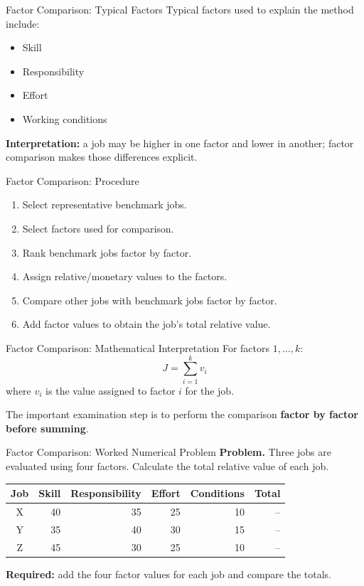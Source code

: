 \documentclass[aspectratio=169,10pt]{beamer}
\begin{document}
\begin{frame}{Factor Comparison: Typical Factors}
Typical factors used to explain the method include:
\begin{itemize}
  \item Skill
  \item Responsibility
  \item Effort
  \item Working conditions
\end{itemize}
\vspace{0.25cm}
\textbf{Interpretation:} a job may be higher in one factor and lower in another; factor comparison makes those differences explicit.
\end{frame}

\begin{frame}{Factor Comparison: Procedure}
\begin{enumerate}
  \item Select representative benchmark jobs.
  \item Select factors used for comparison.
  \item Rank benchmark jobs factor by factor.
  \item Assign relative/monetary values to the factors.
  \item Compare other jobs with benchmark jobs factor by factor.
  \item Add factor values to obtain the job's total relative value.
\end{enumerate}
\end{frame}

\begin{frame}{Factor Comparison: Mathematical Interpretation}
For factors $1,\ldots,k$:
\[
\boxed{J=\sum_{i=1}^{k}v_i}
\]
where $v_i$ is the value assigned to factor $i$ for the job.

\vspace{0.2cm}
The important examination step is to perform the comparison \textbf{factor by factor before summing}.
\end{frame}

\begin{frame}{Factor Comparison: Worked Numerical Problem}
\small
\textbf{Problem.} Three jobs are evaluated using four factors. Calculate the total relative value of each job.
\vspace{0.18cm}
\begin{center}
\begin{tabular}{c|rrrr|r}
\toprule
Job & Skill & Responsibility & Effort & Conditions & Total\\
\midrule
X & 40 & 35 & 25 & 10 & --\\
Y & 35 & 40 & 30 & 15 & --\\
Z & 45 & 30 & 25 & 10 & --\\
\bottomrule
\end{tabular}
\end{center}
\vspace{0.15cm}
\textbf{Required:} add the four factor values for each job and compare the totals.
\end{frame}
\end{document}
